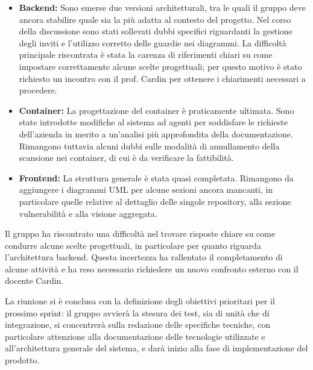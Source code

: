 \documentclass[a4paper, 11pt]{article}
\begin{document}
\begin{itemize}
    \item \textbf{Backend:} Sono emerse due versioni architetturali, tra le quali il gruppo deve ancora stabilire quale sia la più adatta al contesto del progetto. Nel corso della discussione sono stati sollevati dubbi specifici riguardanti la gestione degli inviti e l'utilizzo corretto delle guardie nei diagrammi. La difficoltà principale riscontrata è stata la carenza di riferimenti chiari su come impostare correttamente alcune scelte progettuali; per questo motivo è stato richiesto un incontro con il prof. Cardin per ottenere i chiarimenti necessari a procedere.
    \item \textbf{Container:} La progettazione del container è praticamente ultimata. Sono state introdotte modifiche al sistema ad agenti per soddisfare le richieste dell'azienda in merito a un'analisi più approfondita della documentazione. Rimangono tuttavia alcuni dubbi sulle modalità di annullamento della scansione nei container, di cui è da verificare la fattibilità.
    \item \textbf{Frontend:} La struttura generale è stata quasi completata. Rimangono da aggiungere i diagrammi UML per alcune sezioni ancora mancanti, in particolare quelle relative al dettaglio delle singole repository, alla sezione vulnerabilità e alla visione aggregata.
\end{itemize}

Il gruppo ha riscontrato una difficoltà nel trovare risposte chiare su come condurre alcune scelte progettuali, in particolare per quanto riguarda l'architettura backend. Questa incertezza ha rallentato il completamento di alcune attività e ha reso necessario richiedere un nuovo confronto esterno con il docente Cardin.

La riunione si è conclusa con la definizione degli obiettivi prioritari per il prossimo sprint: il gruppo avvierà la stesura dei test, sia di unità che di integrazione, si concentrerà sulla redazione delle specifiche tecniche, con particolare attenzione alla documentazione delle tecnologie utilizzate e all'architettura generale del sistema, e darà inizio alla fase di implementazione del prodotto.

\end{document}
